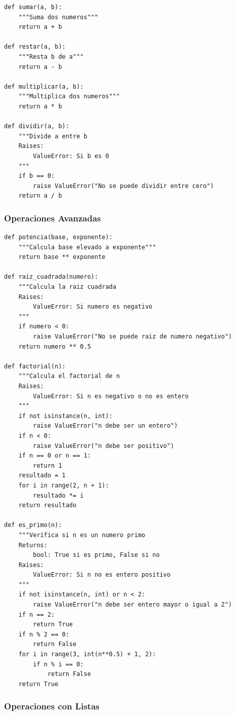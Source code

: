 \documentclass[12pt,a4paper]{article}
\begin{document}
\begin{lstlisting}[caption=Operaciones basicas]
def sumar(a, b):
    """Suma dos numeros"""
    return a + b

def restar(a, b):
    """Resta b de a"""
    return a - b

def multiplicar(a, b):
    """Multiplica dos numeros"""
    return a * b

def dividir(a, b):
    """Divide a entre b
    Raises:
        ValueError: Si b es 0
    """
    if b == 0:
        raise ValueError("No se puede dividir entre cero")
    return a / b
\end{lstlisting}

\subsubsection{Operaciones Avanzadas}

\begin{lstlisting}[caption=Operaciones avanzadas]
def potencia(base, exponente):
    """Calcula base elevado a exponente"""
    return base ** exponente

def raiz_cuadrada(numero):
    """Calcula la raiz cuadrada
    Raises:
        ValueError: Si numero es negativo
    """
    if numero < 0:
        raise ValueError("No se puede raiz de numero negativo")
    return numero ** 0.5

def factorial(n):
    """Calcula el factorial de n
    Raises:
        ValueError: Si n es negativo o no es entero
    """
    if not isinstance(n, int):
        raise ValueError("n debe ser un entero")
    if n < 0:
        raise ValueError("n debe ser positivo")
    if n == 0 or n == 1:
        return 1
    resultado = 1
    for i in range(2, n + 1):
        resultado *= i
    return resultado

def es_primo(n):
    """Verifica si n es un numero primo
    Returns:
        bool: True si es primo, False si no
    Raises:
        ValueError: Si n no es entero positivo
    """
    if not isinstance(n, int) or n < 2:
        raise ValueError("n debe ser entero mayor o igual a 2")
    if n == 2:
        return True
    if n % 2 == 0:
        return False
    for i in range(3, int(n**0.5) + 1, 2):
        if n % i == 0:
            return False
    return True
\end{lstlisting}

\subsubsection{Operaciones con Listas}
\end{document}
